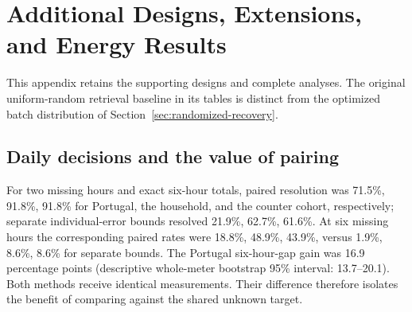 \documentclass[12pt]{article}
\begin{document}
\section{Additional Designs, Extensions, and Energy Results}\label{app:additional}
This appendix retains the supporting designs and complete analyses. The
original uniform-random retrieval baseline in its tables is distinct from
the optimized batch distribution of Section~\ref{sec:randomized-recovery}.
\subsection{Daily decisions and the value of pairing}\label{app:restricted-daily}
For two missing hours and exact six-hour totals, paired resolution was
71.5\%, 91.8\%, 91.8\% for Portugal, the household,
and the counter cohort, respectively; separate individual-error bounds
resolved 21.9\%, 62.7\%, 61.6\%. At six missing
hours the corresponding paired rates were 18.8\%, 48.9\%, 43.9\%,
versus 1.9\%, 8.6\%, 8.6\% for separate bounds.
The Portugal six-hour-gap gain was 16.9
percentage points (descriptive whole-meter bootstrap 95\% interval:
13.7--20.1).
Both methods receive identical measurements. Their difference therefore
isolates the benefit of comparing against the shared unknown target.
\end{document}
